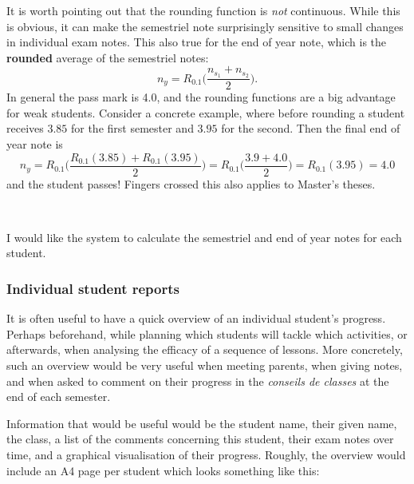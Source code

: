 \documentclass[10pt]{article}
\begin{document}
It is worth pointing out that the rounding function is \emph{not} continuous. While this is obvious, it can make the semestriel note surprisingly sensitive to small changes in individual exam notes. This also true for the end of year note, which is the \textbf{rounded} average of the semestriel notes:
$$n_y = R_{0.1} \Bigg( \frac{n_{s_1} + n_{s_2}}{2} \Bigg).$$
In general the pass mark is 4.0, and the rounding functions are a big advantage for weak students. Consider a concrete example, where before rounding a student receives $3.85$ for the first semester and $3.95$ for the second. Then the final end of year note is
$$n_y = R_{0.1}  \Bigg( \frac{R_{0.1}(3.85) +R_{0.1}(3.95)}{2} \Bigg) = R_{0.1} \Bigg( \frac{3.9 + 4.0}{2} \Bigg) = R_{0.1}(3.95) = 4.0$$
and the student passes! Fingers crossed this also applies to Master's theses.

\

I would like the system to calculate the semestriel and end of year notes for each student.

\subsubsection{Individual student reports} \label{output_report}

It is often useful to have a quick overview of an individual student's progress. Perhaps beforehand, while planning which students will tackle which activities, or afterwards, when analysing the efficacy of a sequence of lessons. More concretely, such an overview would be very useful when meeting parents, when giving notes, and when asked to comment on their progress in the \emph{conseils de classes} at the end of each semester.

Information that would be useful would be the student name, their given name, the class, a list of the comments concerning this student, their exam notes over time, and a graphical visualisation of their progress. Roughly, the overview would include an A4 page per student which looks something like this:
\end{document}
